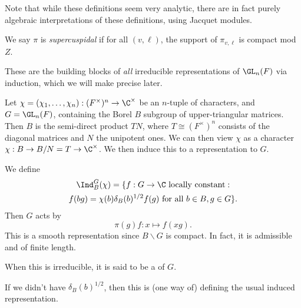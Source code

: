 \documentclass[a4paper]{article}
\begin{document}
Note that while these definitions seem very analytic, there are in fact purely algebraic interpretations of these definitions, using Jacquet modules.

\begin{defi}
  We say $\pi$ is \emph{supercuspidal} if for all $(v, \ell)$, the support of $\pi_{v, \ell}$ is compact mod $Z$.
\end{defi}
These are the building blocks of \emph{all} irreducible representations of $\GL_n(F)$ via induction, which we will make precise later.

Let $\chi = (\chi_1, \ldots, \chi_n): (F^\times)^n \to \C^\times$ be an $n$-tuple of characters, and $G = \GL_n(F)$, containing the Borel $B$ subgroup of upper-triangular matrices. Then $B$ is the semi-direct product $TN$, where $T \cong (F^\times)^n$ consists of the diagonal matrices and $N$ the unipotent ones. We can then view $\chi$ as a character $\chi: B \to B/N = T \to \C^\times$. We then induce this to a representation to $G$.
\begin{defi}
  We define
  \begin{multline*}
    \Ind^G_B (\chi) = \{f: G \to \C\text{ locally constant} :\\
    f(bg) = \chi(b) \delta_B(b)^{1/2} f(g)\text{ for all }b \in B, g \in G\}.
  \end{multline*}
  Then $G$ acts by
  \[
    \pi(g) f: x \mapsto f(xg).
  \]
  This is a smooth representation since $B\backslash G$ is compact. In fact, it is admissible and of finite length.

  When this is irreducible, it is said to be a  of $G$.
\end{defi}
If we didn't have $\delta_B(b)^{1/2}$, then this is (one way of) defining the usual induced representation.
\end{document}
